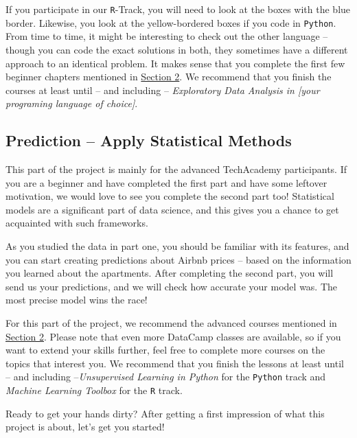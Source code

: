 \documentclass[
  11pt,
]{article}
\begin{document}
If you participate in our \texttt{R}-Track, you will need to look at the boxes with the blue border.
Likewise, you look at the yellow-bordered boxes if you code in \texttt{Python}.
From time to time, it might be interesting to check out the other language -- though you can code the exact solutions in both, they sometimes have a different approach to an identical problem.
It makes sense that you complete the first few beginner chapters mentioned in \href{https://tech-academy-ev.github.io/whats-data-science-and-how-do-i-do-it.html\#whats-data-science-and-how-do-i-do-it}{Section 2}.
We recommend that you finish the courses at least until -- and including -- \emph{Exploratory Data Analysis in {[}your programing language of choice{]}}.

\hypertarget{prediction-apply-statistical-methods}{%
\subsection{Prediction -- Apply Statistical Methods}\label{prediction-apply-statistical-methods}}

This part of the project is mainly for the advanced TechAcademy participants.
If you are a beginner and have completed the first part and have some leftover motivation, we would love to see you complete the second part too!
Statistical models are a significant part of data science, and this gives you a chance to get acquainted with such frameworks.

As you studied the data in part one, you should be familiar with its features, and you can start creating predictions about Airbnb prices -- based on the information you learned about the apartments.
After completing the second part, you will send us your predictions, and we will check how accurate your model was.
The most precise model wins the race!

For this part of the project, we recommend the advanced courses mentioned in \href{https://tech-academy-ev.github.io/whats-data-science-and-how-do-i-do-it.html\#whats-data-science-and-how-do-i-do-it}{Section 2}.
Please note that even more DataCamp classes are available, so if you want to extend your skills further, feel free to complete more courses on the topics that interest you.
We recommend that you finish the lessons at least until -- and including --\emph{Unsupervised Learning in Python} for the \texttt{Python} track and \emph{Machine Learning Toolbox} for the \texttt{R} track.

Ready to get your hands dirty?
After getting a first impression of what this project is about, let's get you started!
\end{document}
